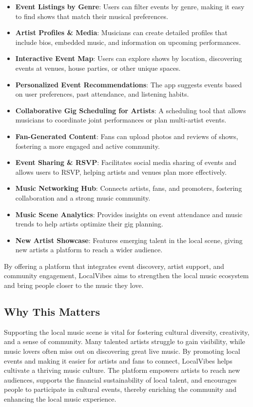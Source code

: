\documentclass{article}
\begin{document}
\begin{itemize}
    \item \textbf{Event Listings by Genre}: Users can filter events by genre, making it easy to find shows that match their musical preferences.
    \item \textbf{Artist Profiles \& Media}: Musicians can create detailed profiles that include bios, embedded music, and information on upcoming performances.
    \item \textbf{Interactive Event Map}: Users can explore shows by location, discovering events at venues, house parties, or other unique spaces.
    \item \textbf{Personalized Event Recommendations}: The app suggests events based on user preferences, past attendance, and listening habits.
    \item \textbf{Collaborative Gig Scheduling for Artists}: A scheduling tool that allows musicians to coordinate joint performances or plan multi-artist events.
    \item \textbf{Fan-Generated Content}: Fans can upload photos and reviews of shows, fostering a more engaged and active community.
    \item \textbf{Event Sharing \& RSVP}: Facilitates social media sharing of events and allows users to RSVP, helping artists and venues plan more effectively.
    \item \textbf{Music Networking Hub}: Connects artists, fans, and promoters, fostering collaboration and a strong music community.
    \item \textbf{Music Scene Analytics}: Provides insights on event attendance and music trends to help artists optimize their gig planning.
    \item \textbf{New Artist Showcase}: Features emerging talent in the local scene, giving new artists a platform to reach a wider audience.
\end{itemize}


By offering a platform that integrates event discovery, artist support, and community engagement, LocalVibes aims to strengthen the local music ecosystem and bring people closer to the music they love.

\subsection*{Why This Matters}

Supporting the local music scene is vital for fostering cultural diversity, creativity, and a sense of community. Many talented artists struggle to gain visibility, while music lovers often miss out on discovering great live music. By promoting local events and making it easier for artists and fans to connect, LocalVibes helps cultivate a thriving music culture. The platform empowers artists to reach new audiences, supports the financial sustainability of local talent, and encourages people to participate in cultural events, thereby enriching the community and enhancing the local music experience.
\end{document}

